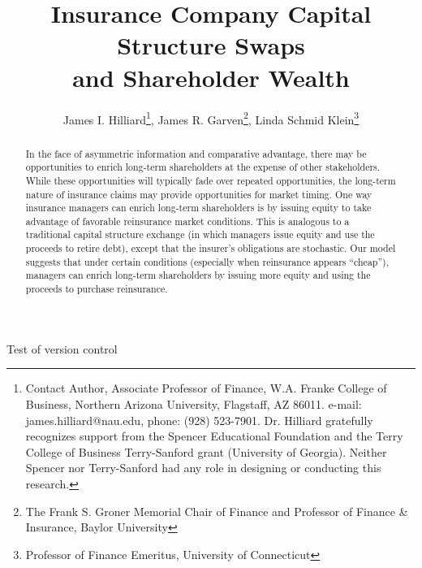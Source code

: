 \documentclass[12pt]{article}
\title{\textbf{Insurance Company Capital Structure Swaps\\and Shareholder Wealth}}
\author{James I. Hilliard\footnote{Contact Author, Associate Professor of Finance, W.A. Franke College of Business, Northern Arizona University, Flagstaff, AZ 86011.  e-mail: james.hilliard@nau.edu, phone: (928) 523-7901. Dr. Hilliard gratefully recognizes support from the Spencer Educational Foundation and the Terry College of Business Terry-Sanford grant (University of Georgia).  Neither Spencer nor Terry-Sanford had any role in designing or conducting this research.}, James R. Garven\footnote{The Frank S. Groner Memorial Chair of Finance and Professor of Finance \& Insurance, Baylor University}, Linda Schmid Klein\footnote{Professor of Finance Emeritus, University of Connecticut}}
\begin{document}
\maketitle%
Test of version control
\begin{abstract}
In the face of asymmetric information and comparative advantage, there may be opportunities to enrich long-term shareholders at the expense of other stakeholders. While these opportunities will typically fade over repeated opportunities, the long-term nature of insurance claims may provide opportunities for market timing.  One way insurance managers can enrich long-term shareholders is by issuing equity to take advantage of favorable reinsurance market conditions. This is analogous to a traditional capital structure exchange (in which managers issue equity and use the proceeds to retire debt), except that the insurer's obligations are stochastic. Our model suggests that under certain conditions (especially when reinsurance appears ``cheap''), managers can enrich long-term shareholders by issuing more equity and using the proceeds to purchase reinsurance.

\end{abstract}

\doublespacing





\newpage\singlespacing
\end{document}

